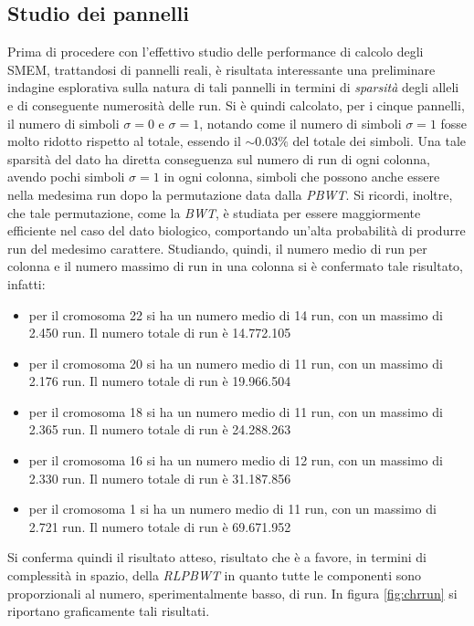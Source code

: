 \subsection{Studio dei pannelli}
Prima di procedere con l'effettivo studio delle performance di calcolo degli
SMEM, trattandosi di pannelli reali, è risultata interessante una preliminare
indagine esplorativa sulla natura di tali pannelli in termini di
\textit{sparsità} degli alleli e di conseguente numerosità delle run. Si è
quindi calcolato, per i cinque pannelli, il numero di simboli $\sigma=0$ e
$\sigma=1$, notando come il numero di simboli $\sigma=1$ fosse molto ridotto
rispetto al totale, essendo il $\sim 0.03\%$ del totale dei simboli. Una tale
sparsità del dato ha diretta conseguenza sul numero di run di ogni colonna, avendo
pochi simboli $\sigma=1$ in ogni colonna, simboli che possono anche
essere nella medesima run dopo la permutazione data dalla
\textit{PBWT}. Si ricordi, inoltre, che tale permutazione, come la
\textit{BWT}, è studiata per essere 
maggiormente efficiente nel caso del dato biologico, comportando un'alta
probabilità di produrre run del medesimo carattere. Studiando, quindi, il
numero medio di run per colonna e il numero 
massimo di run in una colonna si è confermato tale risultato, infatti:
\begin{itemize}
  \item per il cromosoma 22 si ha un numero medio di 14 run, con un massimo di
  2.450 run. Il numero totale di run è 14.772.105
  \item per il cromosoma 20 si ha un numero medio di 11 run, con un massimo di
  2.176 run. Il numero totale di run è 19.966.504
  \item per il cromosoma 18 si ha un numero medio di 11 run, con un massimo di
  2.365 run. Il numero totale di run è 24.288.263
  \item per il cromosoma 16 si ha un numero medio di 12 run, con un massimo di
  2.330 run. Il numero totale di run è 31.187.856
  \item per il cromosoma 1 si ha un numero medio di 11 run, con un massimo di
  2.721 run. Il numero totale di run è 69.671.952
\end{itemize}
Si conferma quindi il risultato atteso, risultato che è a favore, in termini di
complessità in spazio, della \textit{RLPBWT} in quanto tutte le componenti sono
proporzionali al numero, sperimentalmente basso, di run. In figura
\ref{fig:chrrun} si riportano graficamente tali risultati.
